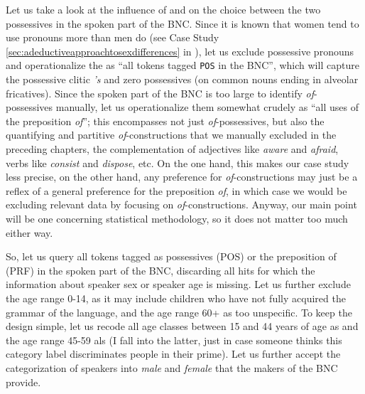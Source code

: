 Let us take a look at the influence of  and  on the choice between the two possessives  in the spoken  part of the BNC.  Since it is known that women tend to use pronouns  more than men do (see Case Study \ref{sec:adeductiveapproachtosexdifferences} in ), let us exclude possessive pronouns and operationalize  the  as ``all tokens tagged  \texttt{POS} in the BNC'',  which will capture the possessive clitic  \textit{'s} and zero possessives (on common nouns  ending in alveolar fricatives). Since the spoken  part of the BNC is too large to identify \textit{of}-possessives manually,  let us operationalize  them somewhat crudely as ``all uses of the preposition  \textit{of}''; this encompasses not just \textit{of}-possessives,  but also the quantifying and partitive \textit{of}-constructions that we manually  excluded in the preceding chapters, the complementation of adjectives  like \textit{aware} and \textit{afraid}, verbs  like \textit{consist} and \textit{dispose}, etc. On the one hand, this makes our case study less precise, on the other hand, any preference for \textit{of}-constructions may just be a reflex of a general preference for the preposition  \textit{of}, in which case we would be excluding relevant data by focusing on \textit{of}-constructions. Anyway, our main point will be one concerning statistical methodology, so it does not matter too much either way.

So, let us query all tokens tagged  as possessives  (POS) or the preposition  of (PRF) in the spoken  part of the BNC,  discarding all hits for which the information about speaker sex or speaker age  is missing. Let us further exclude the age  range 0-14, as it may include children who have not fully acquired  the grammar of the language, and the age  range 60+ as too unspecific. To keep the design  simple, let us recode all age  classes between 15 and 44 years of age  as  and the age  range 45-59 als  (I fall into the latter, just in case someone thinks this category label discriminates people in their prime). Let us further accept the categorization  of speakers into \textit{male} and \textit{female} that the makers of the BNC  provide.


